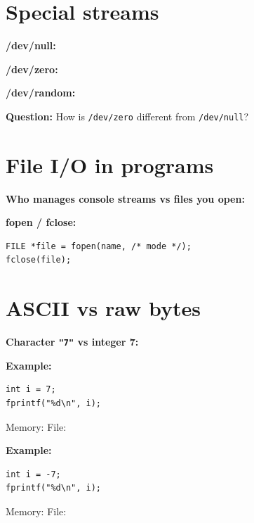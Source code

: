 \documentclass[12pt]{article}
\begin{document}
\newpage
\section*{Special streams}

\Needspace{0.70\textheight}
\noindent\textbf{/dev/null:}
\vspace{0.14\textheight}

\noindent\textbf{/dev/zero:}
\vspace{0.14\textheight}

\noindent\textbf{/dev/random:}
\vspace{0.14\textheight}

\noindent\textbf{Question:} How is \texttt{/dev/zero} different from \texttt{/dev/null}?
\vspace{0.22\textheight}

\newpage
\section*{File I/O in programs}

\Needspace{0.24\textheight}
\noindent\textbf{Who manages console streams vs files you open:}
\vspace{0.14\textheight}

\Needspace{0.36\textheight}
\noindent\textbf{fopen / fclose:}
\vspace{0.16\textheight}

\begin{lstlisting}
FILE *file = fopen(name, /* mode */);
fclose(file);
\end{lstlisting}
\vspace{0.12\textheight}

\newpage
\section*{ASCII vs raw bytes}

\Needspace{0.32\textheight}
\noindent\textbf{Character \texttt{"7"} vs integer 7:}
\vspace{0.22\textheight}

\Needspace{0.28\textheight}
\noindent\textbf{Example:}
\begin{lstlisting}
int i = 7;
fprintf("%d\n", i);
\end{lstlisting}
\noindent Memory: \hspace{8em} File:
\vspace{0.12\textheight}

\noindent\textbf{Example:}
\begin{lstlisting}
int i = -7;
fprintf("%d\n", i);
\end{lstlisting}
\noindent Memory: \hspace{8em} File:
\vspace{0.12\textheight}
\end{document}
